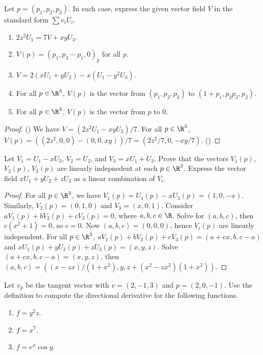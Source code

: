 \begin{exercise}[1.2.3]
    Let $p=({p}_{1},{p}_{2},{p}_{3})$. In each case, express the given vector field $V$ in the standard form $\sum{v}_{i}{U}_{i}$. 
    \begin{enumerate}
        \item $2{z}^{2}{U}_{1}=7V+xy{U}_{3}$.
        \item $V(p)={({p}_{1},{p}_{3}-{p}_{1},0)}_{p}$ for all $p$.
        \item $V=2(x{U}_{1}+y{U}_{2})-x({U}_{1}-{y}^{2}{U}_{3})$.
        \item For all $p\in{\R}^{3}$, $V(p)$ is the vector from $({p}_{1},{p}_{2},{p}_{3})$ to $(1+{p}_{1},{p}_{2}{p}_{3},{p}_{2})$.
        \item For all $p\in{\R}^{3}$, $V(p)$ is the vector from $p$ to 0.
    \end{enumerate}
\end{exercise}
\begin{proof}
    () We have $V=(2{z}^{2}{U}_{1}-xy{U}_{3})/7$. For all $p\in{\R}^{3}$, $V(p)=((2{z}^{2},0,0)-(0,0,xy))/7=(2{z}^{2}/7,0,-xy/7)$. () 
\end{proof}
\begin{exercise}[1.2.5]
    Let ${V}_{1}={U}_{1}-x{U}_{3}$, ${V}_{2}={U}_{2}$, and ${V}_{3}=x{U}_{1}+{U}_{3}$. Prove that the vectors ${V}_{1}(p)$, ${V}_{2}(p)$, ${V}_{3}(p)$ are linearly indepnedent at each $p\in{\R}^{3}$. Express the vector field $x{U}_{1}+y{U}_{2}+z{U}_{3}$ as a linear combination of ${V}_{i}$.
\end{exercise}
\begin{proof}
    For all $p\in{\R}^{3}$, we have ${V}_{1}(p)={U}_{1}(p)-x{U}_{3}(p)=(1,0,-x)$. Similarly, ${V}_{2}(p)=(0,1,0)$ and ${V}_{3}=(x,0,1)$. Consider $a{V}_{1}(p)+b{V}_{2}(p)+c{V}_{3}(p)=0$, where $a,b,c\in\R$. Solve for $(a,b,c)$, then $c({x}^{2}+1)=0$, so $c=0$. Now $(a,b,c)=(0,0,0)$, hence ${V}_{i}(p)$ are linearly independent. For all $p\in{\R}^{3}$, $a{V}_{1}(p)+b{V}_{2}(p)+c{V}_{3}(p)=(a+cx,b,c-a)$ and $x{U}_{1}(p)+y{U}_{2}(p)+z{U}_{3}(p)=(x,y,z)$. Solve $(a+cx,b,c-a)=(x,y,z)$, then $(a,b,c)=((x-zx)/(1+{x}^{2}),y,z+({x}^{2}-z{x}^{2})(1+{x}^{2}))$. 
\end{proof}
\begin{exercise}[1.3.1]
    Let ${v}_{p}$ be the tangent vector with $v=(2,-1,3)$ and $p=(2,0,-1)$. Use the definition to compute the directional derivative for the following functions.
    \begin{enumerate}
        \item $f={y}^{2}z$.
        \item $f={x}^{7}$.
        \item $f={e}^{x}\cos y$.
    \end{enumerate}
\end{exercise}
